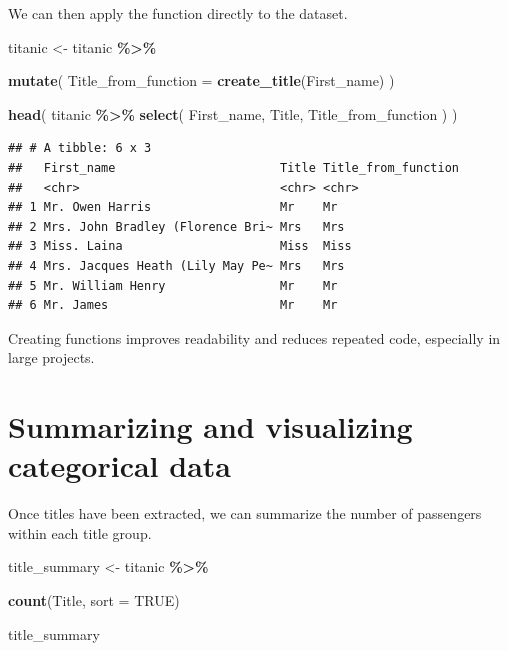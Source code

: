 \documentclass[
  11pt,
  oneside]{book}
\newenvironment{Shaded}{\begin{snugshade}}{\end{snugshade}}
\newcommand{\AttributeTok}[1]{\textcolor[rgb]{0.13,0.29,0.53}{#1}}
\newcommand{\ConstantTok}[1]{\textcolor[rgb]{0.56,0.35,0.01}{#1}}
\newcommand{\FunctionTok}[1]{\textcolor[rgb]{0.13,0.29,0.53}{\textbf{#1}}}
\newcommand{\NormalTok}[1]{#1}
\newcommand{\OtherTok}[1]{\textcolor[rgb]{0.56,0.35,0.01}{#1}}
\newcommand{\SpecialCharTok}[1]{\textcolor[rgb]{0.81,0.36,0.00}{\textbf{#1}}}
\begin{document}
We can then apply the function directly to the dataset.

\begin{Shaded}
\begin{Highlighting}[]
\NormalTok{titanic }\OtherTok{\textless{}{-}}\NormalTok{ titanic }\SpecialCharTok{\%\textgreater{}\%}
  
  \FunctionTok{mutate}\NormalTok{(}
    \AttributeTok{Title\_from\_function =}
      \FunctionTok{create\_title}\NormalTok{(First\_name)}
\NormalTok{  )}

\FunctionTok{head}\NormalTok{(}
\NormalTok{  titanic }\SpecialCharTok{\%\textgreater{}\%}
    \FunctionTok{select}\NormalTok{(}
\NormalTok{      First\_name,}
\NormalTok{      Title,}
\NormalTok{      Title\_from\_function}
\NormalTok{    )}
\NormalTok{)}
\end{Highlighting}
\end{Shaded}

\begin{verbatim}
## # A tibble: 6 x 3
##   First_name                       Title Title_from_function
##   <chr>                            <chr> <chr>              
## 1 Mr. Owen Harris                  Mr    Mr                 
## 2 Mrs. John Bradley (Florence Bri~ Mrs   Mrs                
## 3 Miss. Laina                      Miss  Miss               
## 4 Mrs. Jacques Heath (Lily May Pe~ Mrs   Mrs                
## 5 Mr. William Henry                Mr    Mr                 
## 6 Mr. James                        Mr    Mr
\end{verbatim}

Creating functions improves readability and reduces repeated code, especially in large projects.

\section{Summarizing and visualizing categorical data}\label{summarizing-and-visualizing-categorical-data}

Once titles have been extracted, we can summarize the number of passengers within each title group.

\begin{Shaded}
\begin{Highlighting}[]
\NormalTok{title\_summary }\OtherTok{\textless{}{-}}\NormalTok{ titanic }\SpecialCharTok{\%\textgreater{}\%}
  
  \FunctionTok{count}\NormalTok{(Title, }\AttributeTok{sort =} \ConstantTok{TRUE}\NormalTok{)}

\NormalTok{title\_summary}
\end{Highlighting}
\end{Shaded}
\end{document}
